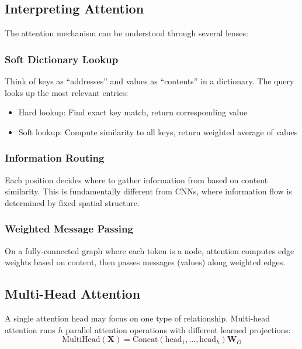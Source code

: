 \subsection{Interpreting Attention}

The attention mechanism can be understood through several lenses:

\subsubsection{Soft Dictionary Lookup}

Think of keys as ``addresses'' and values as ``contents'' in a dictionary. The query looks up the most relevant entries:
\begin{itemize}
    \item Hard lookup: Find exact key match, return corresponding value
    \item Soft lookup: Compute similarity to all keys, return weighted average of values
\end{itemize}

\subsubsection{Information Routing}

Each position decides where to gather information from based on content similarity. This is fundamentally different from CNNs, where information flow is determined by fixed spatial structure.

\subsubsection{Weighted Message Passing}

On a fully-connected graph where each token is a node, attention computes edge weights based on content, then passes messages (values) along weighted edges.

\subsection{Multi-Head Attention}

A single attention head may focus on one type of relationship. Multi-head attention runs $h$ parallel attention operations with different learned projections:
\begin{equation}
\text{MultiHead}(\mathbf{X}) = \text{Concat}(\text{head}_1, \ldots, \text{head}_h) \mathbf{W}_O
\label{eq:multihead}
\end{equation}

